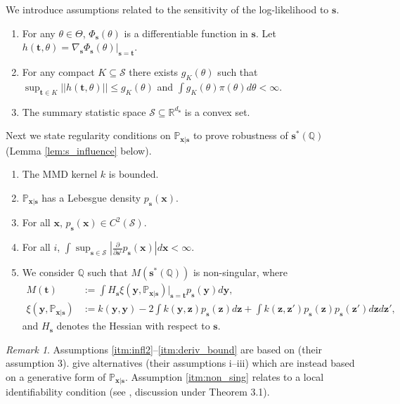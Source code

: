 \documentclass{article}
\theoremstyle{plain}
\theoremstyle{definition}
\theoremstyle{remark}
\newtheorem{remark}[theorem]{Remark}
\begin{document}
We introduce assumptions related to the sensitivity of the log-likelihood to $\mathbf{s}$.
\begin{enumerate}[resume]
  \item For any $\theta \in \Theta$,
  $\Phi_\mathbf{s}(\theta)$ is a differentiable function in $\mathbf{s}$.
  Let $h(\mathbf{t},\theta) = \nabla_\mathbf{s} \Phi_\mathbf{s}(\theta) \vert_{\mathbf{s} = \mathbf{t}}$.
  \item \label{itm:log_likelihood_sensitivity}
  For any compact $K \subseteq \mathcal{S}$ there exists $g_K(\theta)$ such that
  $\sup_{\mathbf{t} \in K} || h(\mathbf{t}, \theta) || \leq g_K(\theta)$
  and $\int g_{K}(\theta) \pi(\theta) d\theta < \infty$.
  \item \label{itm:convexity}
  The summary statistic space $\mathcal{S} \subseteq \mathbb{R}^{d_\mathbf{s}}$ is a convex set.
\end{enumerate}

Next we state regularity conditions on $\mathbb{P}_{\mathbf{x}|\mathbf{s}}$
to prove robustness of $\mathbf{s}^*(\mathbb{Q})$ (Lemma \ref{lem:s_influence} below).
\begin{enumerate}[resume]
  \item \label{itm:infl1} The MMD kernel $k$ is bounded.
  \item \label{itm:infl2} $\mathbb{P}_{\mathbf{x}|\mathbf{s}}$ has a Lebesgue density $p_\mathbf{s}(\mathbf{x})$.
  \item For all $\mathbf{x}$, $p_\mathbf{s}(\mathbf{x}) \in C^2(\mathcal{S})$.
  \item \label{itm:deriv_bound} For all $i$,
  $\int \sup_{\mathbf{s} \in \mathcal{S}} \left| \frac{\partial}{\partial \mathbf{s}^i} p_\mathbf{s}(\mathbf{x}) \right| d\mathbf{x} < \infty$.
  \item \label{itm:non_sing}
  We consider $\mathbb{Q}$ such that $M(\mathbf{s}^*(\mathbb{Q}))$ is non-singular, where
  \begin{align*}
    M(\mathbf{t}) &:= \int H_\mathbf{s} \xi(\mathbf{y}, \mathbb{P}_{\mathbf{x}|\mathbf{s}}) \Big|_{\mathbf{s}=\mathbf{t}} p_{\mathbf{s}}(\mathbf{y}) d\mathbf{y}, \\
    \xi(\mathbf{y}, \mathbb{P}_{\mathbf{x}|\mathbf{s}}) &:= k(\mathbf{y}, \mathbf{y})
    - 2 \int k(\mathbf{y}, \mathbf{z}) p_\mathbf{s}(\mathbf{z}) d\mathbf{z}
    + \int k(\mathbf{z}, \mathbf{z}') p_\mathbf{s}(\mathbf{z}) p_\mathbf{s}(\mathbf{z}') d\mathbf{z} d\mathbf{z}',
  \end{align*}
  and $H_\mathbf{s}$ denotes the Hessian with respect to $\mathbf{s}$.
\end{enumerate}
\begin{remark}
  Assumptions \ref{itm:infl2}--\ref{itm:deriv_bound} are based on \citet{key2025composite} (their assumption 3).
  \citet{briolStatisticalInferenceGenerative2019b} give alternatives (their assumptions i--iii) 
  which are instead based on a generative form of $\mathbb{P}_{\mathbf{x}|\mathbf{s}}$.
  Assumption \ref{itm:non_sing} relates to a local identifiability condition
  (see \citealp{newey1994large}, discussion under Theorem 3.1).
\end{remark}
\end{document}
